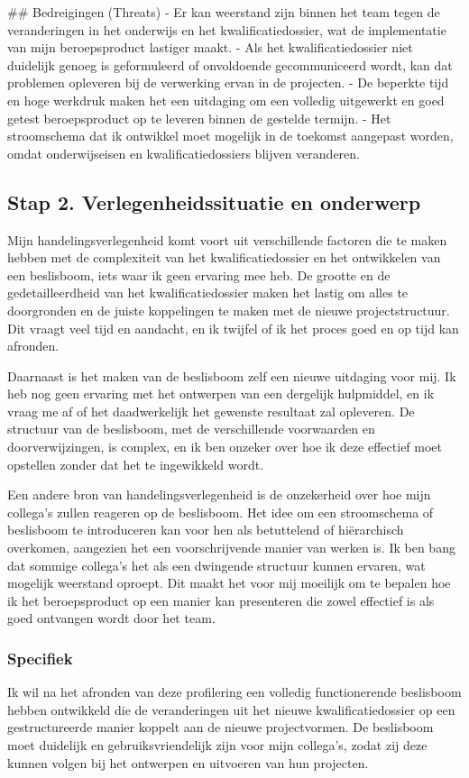 ## Bedreigingen (Threats)
- Er kan weerstand zijn binnen het team tegen de veranderingen in het onderwijs en het kwalificatiedossier, wat de implementatie van mijn beroepsproduct lastiger maakt.
- Als het kwalificatiedossier niet duidelijk genoeg is geformuleerd of onvoldoende gecommuniceerd wordt, kan dat problemen opleveren bij de verwerking ervan in de projecten.
- De beperkte tijd en hoge werkdruk maken het een uitdaging om een volledig uitgewerkt en goed getest beroepsproduct op te leveren binnen de gestelde termijn.
- Het stroomschema dat ik ontwikkel moet mogelijk in de toekomst aangepast worden, omdat onderwijseisen en kwalificatiedossiers blijven veranderen.

\subsection{Stap 2. Verlegenheidssituatie en onderwerp}


Mijn handelingsverlegenheid komt voort uit verschillende factoren die te maken hebben met de complexiteit van het kwalificatiedossier en het ontwikkelen van een beslisboom, iets waar ik geen ervaring mee heb. De grootte en de gedetailleerdheid van het kwalificatiedossier maken het lastig om alles te doorgronden en de juiste koppelingen te maken met de nieuwe projectstructuur. Dit vraagt veel tijd en aandacht, en ik twijfel of ik het proces goed en op tijd kan afronden.

Daarnaast is het maken van de beslisboom zelf een nieuwe uitdaging voor mij. Ik heb nog geen ervaring met het ontwerpen van een dergelijk hulpmiddel, en ik vraag me af of het daadwerkelijk het gewenste resultaat zal opleveren. De structuur van de beslisboom, met de verschillende voorwaarden en doorverwijzingen, is complex, en ik ben onzeker over hoe ik deze effectief moet opstellen zonder dat het te ingewikkeld wordt.

Een andere bron van handelingsverlegenheid is de onzekerheid over hoe mijn collega's zullen reageren op de beslisboom. Het idee om een stroomschema of beslisboom te introduceren kan voor hen als betuttelend of hiërarchisch overkomen, aangezien het een voorschrijvende manier van werken is. Ik ben bang dat sommige collega's het als een dwingende structuur kunnen ervaren, wat mogelijk weerstand oproept. Dit maakt het voor mij moeilijk om te bepalen hoe ik het beroepsproduct op een manier kan presenteren die zowel effectief is als goed ontvangen wordt door het team.


\subsubsection{Specifiek}
Ik wil na het afronden van deze profilering een volledig functionerende beslisboom hebben ontwikkeld die de veranderingen uit het nieuwe kwalificatiedossier op een gestructureerde manier koppelt aan de nieuwe projectvormen. De beslisboom moet duidelijk en gebruiksvriendelijk zijn voor mijn collega's, zodat zij deze kunnen volgen bij het ontwerpen en uitvoeren van hun projecten.

